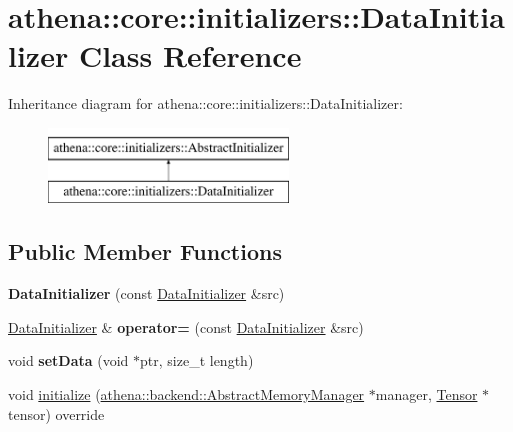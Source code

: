 \hypertarget{classathena_1_1core_1_1initializers_1_1_data_initializer}{}\section{athena\+:\+:core\+:\+:initializers\+:\+:Data\+Initializer Class Reference}
\label{classathena_1_1core_1_1initializers_1_1_data_initializer}
Inheritance diagram for athena\+:\+:core\+:\+:initializers\+:\+:Data\+Initializer\+:\begin{figure}[H]
\begin{center}
\leavevmode
\includegraphics[height=2.000000cm]{classathena_1_1core_1_1initializers_1_1_data_initializer}
\end{center}
\end{figure}
\subsection*{Public Member Functions}
\begin{DoxyCompactItemize}
\item 
\mbox{\label{classathena_1_1core_1_1initializers_1_1_data_initializer_a84b8be47f01caffa74db33ffc254dd43}} 
{\bfseries Data\+Initializer} (const \mbox{\hyperlink{classathena_1_1core_1_1initializers_1_1_data_initializer}{Data\+Initializer}} \&src)
\item 
\mbox{\label{classathena_1_1core_1_1initializers_1_1_data_initializer_abab352c808648db98422d1c436589d9e}} 
\mbox{\hyperlink{classathena_1_1core_1_1initializers_1_1_data_initializer}{Data\+Initializer}} \& {\bfseries operator=} (const \mbox{\hyperlink{classathena_1_1core_1_1initializers_1_1_data_initializer}{Data\+Initializer}} \&src)
\item 
\mbox{\label{classathena_1_1core_1_1initializers_1_1_data_initializer_a9ea7f09748c0ca5dff13607b9076cb39}} 
void {\bfseries set\+Data} (void $\ast$ptr, size\+\_\+t length)
\item 
void \mbox{\hyperlink{classathena_1_1core_1_1initializers_1_1_data_initializer_a984213526b2741e423f230098c71520a}{initialize}} (\mbox{\hyperlink{classathena_1_1backend_1_1_abstract_memory_manager}{athena\+::backend\+::\+Abstract\+Memory\+Manager}} $\ast$manager, \mbox{\hyperlink{classathena_1_1core_1_1_tensor}{Tensor}} $\ast$tensor) override
\end{DoxyCompactItemize}


